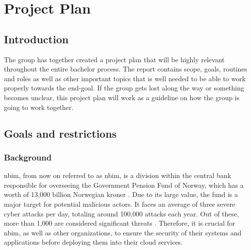 





\chapter{Project Plan}
\label{app:additional}



\section{Introduction}
The group has together created a project plan that will be highly relevant throughout the entire bachelor process. The report contains scope, goals, routines and roles as well as other important topics that is well needed to be able to work properly towards the end-goal. If the group gets lost along the way or something becomes unclear, this project plan will work as a guideline on how the group is going to work together. 

\newpage
\section{Goals and restrictions}
\subsection{Background}
\acrlong{nbim}, from now on referred to as \acrshort{nbim}, is a division within the central bank responsible for overseeing the Government Pension Fund of Norway, which has a worth of 13,000 billion Norwegian kroner \cite{nbimwebsite}. Due to its large value, the fund is a major target for potential malicious actors. It faces an average of three severe cyber attacks per day, totaling around 100,000 attacks each year. Out of these, more than 1,000 are considered significant threats \cite{nbimattacks}. Therefore, it is crucial for \acrshort{nbim}, as well as other organizations, to ensure the security of their systems and applications before deploying them into their cloud services. 

